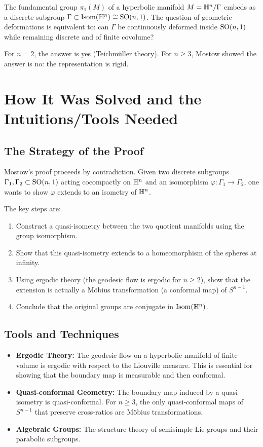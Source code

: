 The fundamental group $\pi_1(M)$ of a hyperbolic manifold $M = \mathbb{H}^n / \Gamma$ embeds as a discrete subgroup $\Gamma \subset \operatorname{Isom}(\mathbb{H}^n) \cong \operatorname{SO}(n,1)$. The question of geometric deformations is equivalent to: can $\Gamma$ be continuously deformed inside $\operatorname{SO}(n,1)$ while remaining discrete and of finite covolume?

For $n = 2$, the answer is yes (Teichm\"uller theory). For $n \geq 3$, Mostow showed the answer is no: the representation is rigid.

\section{How It Was Solved and the Intuitions/Tools Needed}

\subsection{The Strategy of the Proof}

Mostow's proof proceeds by contradiction. Given two discrete subgroups $\Gamma_1, \Gamma_2 \subset \operatorname{SO}(n,1)$ acting cocompactly on $\mathbb{H}^n$ and an isomorphism $\varphi: \Gamma_1 \to \Gamma_2$, one wants to show $\varphi$ extends to an isometry of $\mathbb{H}^n$.

The key steps are:
\begin{enumerate}
    \item Construct a quasi-isometry between the two quotient manifolds using the group isomorphism.
    \item Show that this quasi-isometry extends to a homeomorphism of the spheres at infinity.
    \item Using ergodic theory (the geodesic flow is ergodic for $n \geq 2$), show that the extension is actually a M\"obius transformation (a conformal map) of $S^{n-1}$.
    \item Conclude that the original groups are conjugate in $\operatorname{Isom}(\mathbb{H}^n)$.
\end{enumerate}

\subsection{Tools and Techniques}

\begin{itemize}
    \item \textbf{Ergodic Theory:} The geodesic flow on a hyperbolic manifold of finite volume is ergodic with respect to the Liouville measure. This is essential for showing that the boundary map is measurable and then conformal.
    \item \textbf{Quasi-conformal Geometry:} The boundary map induced by a quasi-isometry is quasi-conformal. For $n \geq 3$, the only quasi-conformal maps of $S^{n-1}$ that preserve cross-ratios are M\"obius transformations.
    \item \textbf{Algebraic Groups:} The structure theory of semisimple Lie groups and their parabolic subgroups.
\end{itemize}

